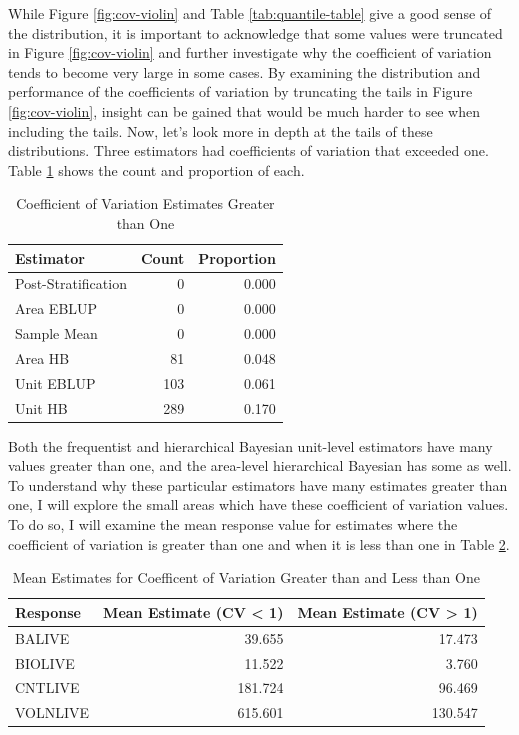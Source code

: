 \documentclass[12pt,twoside]{reedthesis}
\begin{document}
While Figure \ref{fig:cov-violin} and Table \ref{tab:quantile-table} give a good sense of the distribution, it is important to acknowledge that some values were truncated in Figure \ref{fig:cov-violin} and further investigate why the coefficient of variation tends to become very large in some cases. By examining the distribution and performance of the coefficients of variation by truncating the tails in Figure \ref{fig:cov-violin}, insight can be gained that would be much harder to see when including the tails. Now, let's look more in depth at the tails of these distributions. Three estimators had coefficients of variation that exceeded one. Table \ref{tab:over-one} shows the count and proportion of each.
\begin{longtable}[t]{lrr}
\caption{\label{tab:over-one}Coefficient of Variation Estimates Greater than One}\\
\toprule
Estimator & Count & Proportion\\
\midrule
Post-Stratification & 0 & 0.000\\
Area EBLUP & 0 & 0.000\\
Sample Mean & 0 & 0.000\\
Area HB & 81 & 0.048\\
Unit EBLUP & 103 & 0.061\\
\addlinespace
Unit HB & 289 & 0.170\\
\bottomrule
\end{longtable}
Both the frequentist and hierarchical Bayesian unit-level estimators have many values greater than one, and the area-level hierarchical Bayesian has some as well. To understand why these particular estimators have many estimates greater than one, I will explore the small areas which have these coefficient of variation values. To do so, I will examine the mean response value for estimates where the coefficient of variation is greater than one and when it is less than one in Table \ref{tab:covg1l1}.
\begin{longtable}[t]{lrr}
\caption{\label{tab:covg1l1}Mean Estimates for Coefficent of Variation Greater than and Less than One}\\
\toprule
Response & Mean Estimate (CV < 1) & Mean Estimate (CV > 1)\\
\midrule
BALIVE & 39.655 & 17.473\\
BIOLIVE & 11.522 & 3.760\\
CNTLIVE & 181.724 & 96.469\\
VOLNLIVE & 615.601 & 130.547\\
\bottomrule
\end{longtable}
\end{document}
